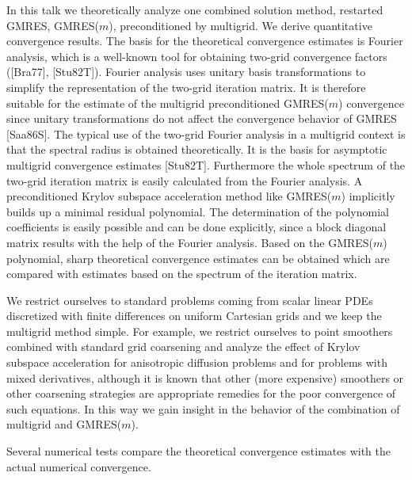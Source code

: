 \documentclass[11pt]{article}
\begin{document}
In this talk we theoretically analyze one combined solution method,
 restarted GMRES,
GMRES($m$), preconditioned by multigrid. We derive quantitative convergence
results. The basis for the theoretical convergence estimates is Fourier
analysis, which is a well-known tool for obtaining two-grid convergence factors
([Bra77], [Stu82T]).
Fourier analysis uses unitary basis transformations to simplify the
representation of the two-grid iteration matrix. It is therefore suitable for
the estimate of the multigrid preconditioned GMRES($m$) convergence since
unitary transformations do not affect the convergence behavior of GMRES
 [Saa86S].
The typical use of the two-grid Fourier analysis in a
multigrid context is that the spectral radius is obtained theoretically.
It is the basis for asymptotic multigrid convergence estimates [Stu82T].
Furthermore the whole spectrum of the two-grid iteration matrix is easily
calculated from the Fourier analysis.
A preconditioned Krylov subspace acceleration method like GMRES($m$)
implicitly builds up a minimal residual polynomial. The determination of the
polynomial coefficients is easily possible and can be done explicitly, since
a block diagonal matrix results with the help of the Fourier analysis.
Based on the GMRES($m$) polynomial, sharp theoretical convergence estimates
can be obtained which are compared with estimates based on the spectrum of
the iteration matrix.

We restrict ourselves to standard problems coming from scalar
linear PDEs discretized with finite differences on uniform Cartesian grids
and we keep the multigrid method simple. For example, we restrict ourselves
to point smoothers combined with standard grid coarsening and analyze the effect
of Krylov subspace acceleration for anisotropic diffusion problems and for
problems  with mixed derivatives, although it is known that other (more
expensive) smoothers or other coarsening strategies are appropriate remedies
for the poor convergence of such equations. In this way we gain insight in the
behavior of the combination of multigrid and GMRES($m$).

Several numerical tests compare the theoretical convergence estimates with the
actual numerical convergence.
\end{document}
